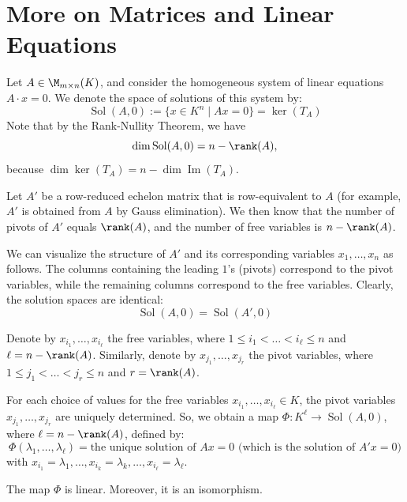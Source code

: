 

\section{More on Matrices and Linear Equations}

Let $A \in \M_{m \times n}(K)$, and consider the homogeneous system of linear equations $A \cdot x = 0$. We denote the space of solutions of this system by:
\begin{equation*}
    \operatorname{Sol}(A, 0) := \{x \in K^n \mid A x = 0\} = \ker(T_A)
\end{equation*}
Note that by the Rank-Nullity Theorem, we have 
\[\dim \operatorname{Sol}(A, 0) = n - \rank(A),\] 
because $\dim \ker(T_A) = n - \dim \operatorname{Im}(T_A)$.

Let $A'$ be a row-reduced echelon matrix that is row-equivalent to $A$ (for example, $A'$ is obtained from $A$ by Gauss elimination). We then know that the number of pivots of $A'$ equals $\rank(A)$, and the number of free variables is $n - \rank(A)$.

We can visualize the structure of $A'$ and its corresponding variables $x_1, \dots, x_n$ as follows. The columns containing the leading $1$'s (pivots) correspond to the pivot variables, while the remaining columns correspond to the free variables. Clearly, the solution spaces are identical:
\begin{equation*}
    \operatorname{Sol}(A, 0) = \operatorname{Sol}(A', 0)
\end{equation*}

Denote by $x_{i_1}, \dots, x_{i_\ell}$ the free variables, where $1 \le i_1 < \dots < i_\ell \le n$ and $\ell = n - \rank(A)$. Similarly, denote by $x_{j_1}, \dots, x_{j_r}$ the pivot variables, where $1 \le j_1 < \dots < j_r \le n$ and $r = \rank(A)$.

For each choice of values for the free variables $x_{i_1}, \dots, x_{i_\ell} \in K$, the pivot variables $x_{j_1}, \dots, x_{j_r}$ are uniquely determined. So, we obtain a map $\Phi: K^\ell \to \operatorname{Sol}(A, 0)$, where $\ell = n - \rank(A)$, defined by:
\begin{equation*}
    \Phi(\lambda_1, \dots, \lambda_\ell) = \text{the unique solution of } Ax = 0 \text{ (which is the solution of } A'x = 0 \text{)}
\end{equation*}
with $x_{i_1} = \lambda_1, \dots, x_{i_k} = \lambda_k, \dots, x_{i_\ell} = \lambda_\ell$.

\begin{proposition}
\label{prop:solution_map_isomorphism}
The map $\Phi$ is linear. Moreover, it is an isomorphism.
\end{proposition}

